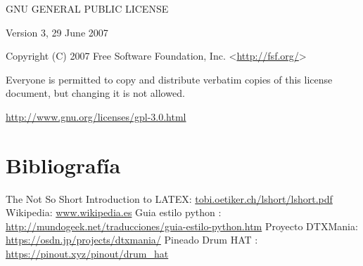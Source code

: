 \documentclass[a4paper,11pt,oneside]{book}
\begin{document}
\begin{center}
GNU GENERAL PUBLIC LICENSE
\end{center}
            
\begin{center}
Version 3, 29 June 2007
\end{center}


 \begin{center}
 Copyright (C) 2007 Free Software Foundation, Inc. <\url{http://fsf.org/}>
 \end{center}

 Everyone is permitted to copy and distribute verbatim copies of this license document, but changing it is not allowed.


\url{http://www.gnu.org/licenses/gpl-3.0.html}



\printnoidxglossaries

\chapter {Bibliografía}
\begin{thebibliography}{99}
 The Not So Short Introduction to LATEX: \url{tobi.oetiker.ch/lshort/lshort.pdf}
 Wikipedia: \url{www.wikipedia.es}
 Guia estilo python : \url{http://mundogeek.net/traducciones/guia-estilo-python.htm}
 Proyecto DTXMania: \url{https://osdn.jp/projects/dtxmania/}
 Pineado Drum HAT : \url{https://pinout.xyz/pinout/drum_hat}
\end{thebibliography}
\end{document}
